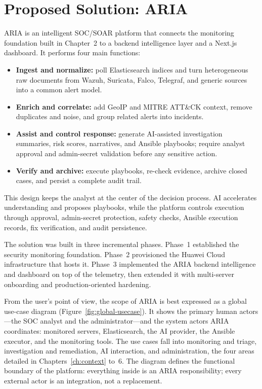 \section{Proposed Solution: ARIA}

ARIA is an intelligent SOC/SOAR platform that connects the monitoring foundation built in Chapter~2 to a backend intelligence layer and a Next.js dashboard. It performs four main functions:

\begin{itemize}[leftmargin=1cm]
\item \textbf{Ingest and normalize:} poll Elasticsearch indices and turn heterogeneous raw documents from Wazuh, Suricata, Falco, Telegraf, and generic sources into a common alert model.
\item \textbf{Enrich and correlate:} add GeoIP and MITRE ATT\&CK context, remove duplicates and noise, and group related alerts into incidents.
\item \textbf{Assist and control response:} generate AI-assisted investigation summaries, risk scores, narratives, and Ansible playbooks; require analyst approval and admin-secret validation before any sensitive action.
\item \textbf{Verify and archive:} execute playbooks, re-check evidence, archive closed cases, and persist a complete audit trail.
\end{itemize}


This design keeps the analyst at the center of the decision process. AI accelerates understanding and proposes playbooks, while the platform controls execution through approval, admin-secret protection, safety checks, Ansible execution records, fix verification, and audit persistence.

The solution was built in three incremental phases. Phase~1 established the security monitoring foundation. Phase~2 provisioned the Huawei Cloud infrastructure that hosts it. Phase~3 implemented the ARIA backend intelligence and dashboard on top of the telemetry, then extended it with multi-server onboarding and production-oriented hardening.


From the user's point of view, the scope of ARIA is best expressed as a global use-case diagram (Figure~\ref{fig:global-usecase}). It shows the primary human actors---the SOC analyst and the administrator---and the system actors ARIA coordinates: monitored servers, Elasticsearch, the AI provider, the Ansible executor, and the monitoring tools. The use cases fall into monitoring and triage, investigation and remediation, AI interaction, and administration, the four areas detailed in Chapters~\ref{ch:context} to~6. The diagram defines the functional boundary of the platform: everything inside is an ARIA responsibility; every external actor is an integration, not a replacement.

